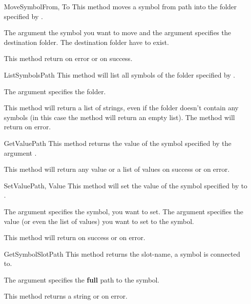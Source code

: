 \begin{methoddesc}[System]{MoveSymbol}{From, To}
This method moves a symbol from path  into the folder specified by 
.

The argument  the symbol you want to move and the argument 
 specifies the destination folder. The destination folder have to exist.

This method return  on error or  on success.
\end{methoddesc}


\begin{methoddesc}[System]{ListSymbols}{Path}
This method will list all symbols of the folder specified by .

The argument  specifies the folder.

This method will return a list of strings, even if the folder doesn't contain 
any symbols (in this case the method will return an empty list). The method
will return  on error.
\end{methoddesc}


\begin{methoddesc}[System]{GetValue}{Path}
This method returns the value of the symbol specified by the argument 
. 

This method will return any value or a list of values on success or 
 on error.
\end{methoddesc}


\begin{methoddesc}[System]{SetValue}{Path, Value}
This method will set the value of the symbol specified by  to 
.

The argument  specifies the symbol, you want to set. The argument 
 specifies the value (or even the list of values) you want to set 
to the symbol.

This method will return  on success or  on error.
\end{methoddesc}


\begin{methoddesc}[System]{GetSymbolSlot}{Path}
This method returns the slot-name, a symbol is connected to. 

The argument  specifies the \textbf{full} path
to the symbol.

This method returns a string or  on error.
\end{methoddesc}


